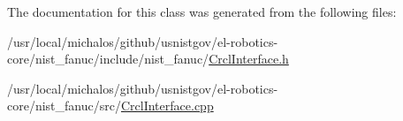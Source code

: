 The documentation for this class was generated from the following files\-:\begin{DoxyCompactItemize}
\item 
/usr/local/michalos/github/usnistgov/el-\/robotics-\/core/nist\-\_\-fanuc/include/nist\-\_\-fanuc/\hyperlink{CrclInterface_8h}{Crcl\-Interface.\-h}\item 
/usr/local/michalos/github/usnistgov/el-\/robotics-\/core/nist\-\_\-fanuc/src/\hyperlink{CrclInterface_8cpp}{Crcl\-Interface.\-cpp}\end{DoxyCompactItemize}
